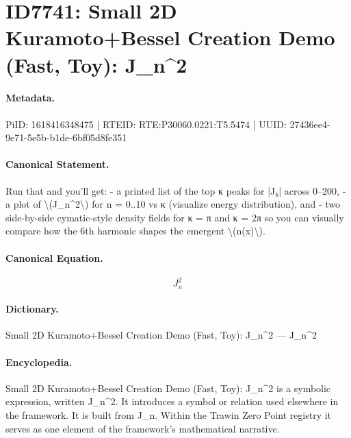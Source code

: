 \section*{ID7741: Small 2D Kuramoto+Bessel Creation Demo (Fast, Toy): J\_n\textasciicircum{}2}
\paragraph{Metadata.}
PiID: 1618416348475 | RTEID: RTE:P30060.0221:T5.5474 | UUID: 27436ee4-9e71-5e5b-b1de-6bf05d8fe351

\paragraph{Canonical Statement.}
Run that and you’ll get: - a printed list of the top κ peaks for |J₆| across 0–200, - a plot of \textbackslash{}(J\_n\textasciicircum{}2\textbackslash{}) for n = 0..10 vs κ (visualize energy distribution), and - two side-by-side cymatic-style density fields for κ = π and κ = 2π so you can visually compare how the 6th harmonic shapes the emergent \textbackslash{}(n(x)\textbackslash{}).

\paragraph{Canonical Equation.}
\[
J_n^2
\]

\paragraph{Dictionary.}
Small 2D Kuramoto+Bessel Creation Demo (Fast, Toy): J\_n\textasciicircum{}2 — J\_n\textasciicircum{}2

\paragraph{Encyclopedia.}
Small 2D Kuramoto+Bessel Creation Demo (Fast, Toy): J\_n\textasciicircum{}2 is a symbolic expression, written J\_n\textasciicircum{}2. It introduces a symbol or relation used elsewhere in the framework. It is built from J\_n. Within the Trawin Zero Point registry it serves as one element of the framework's mathematical narrative.
